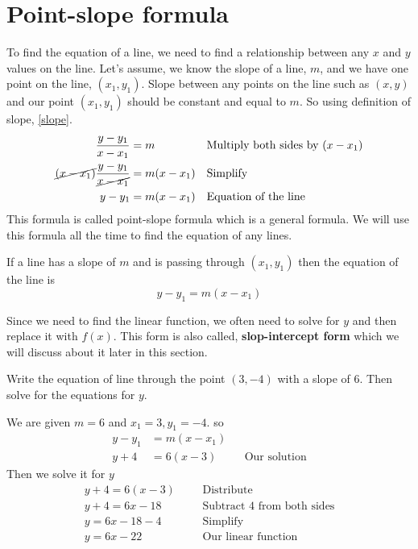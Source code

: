 \section{Point-slope formula}
To find the equation of a line, we need to find a relationship between any $x$ and $y$ values on the line. Let's assume, we know the slope of a line, $m$, and we have one point on the line, $(x_1,y_1)$. Slope between any points on the line such as $(x,y)$ and our point $(x_1,y_1)$ should be
constant and equal to $m$. So using definition of slope, \eqref{slope}.
\begin{align*}
		\frac{y-y_1}{x-x_1} &=m &&\text{Multiply both sides by $(x-x_1)$}
        \\
        \cancel{(x-x_1)}\frac{y-y_1}{ \cancel{x-x_1}} &=m(x-x_1) 
        								&&\text{Simplify} \\
         y-y_1 &= m (x-x_1)			&&\text{Equation of the line} 
\end{align*}
This formula is called point-slope formula which is a general formula. We
will use this formula all the time to find the equation of any lines.
\begin{tcolorbox}[
                    title=Point-Slope formula,
                    fonttitle=\bfseries,
                    colframe=blue!70!red,
                    colback=white
                    ]
    If a line has a slope of $m$ and is passing through $(x_1,y_1)$ then
    the equation of the line is 
    	\begin{equation}
    				y-y_1 = m(x-x_1) \label{point_slope}
    	\end{equation}
\end{tcolorbox}
\begin{nt}
Since we need to find the linear function, we often need to solve for $y$ and then replace it with $f(x)$. This form is also called, \textbf{slop-intercept form} which we will discuss about it later in this section.
\end{nt}
\begin{exa}
	Write the equation of line through the point $(3, -4)$ with a slope of $6$. Then solve for the equations for $y$.
\end{exa}

We are given $m=6$ and $x_1=3, y_1=-4$. so
\begin{align*}
		y-y_1  &=m(x-x_1) &&\\
        y+4 &=6(x-3) &&\text{Our solution}
\end{align*}
Then we solve it for $y$
\begin{align*}
        y+4 =6(x-3)& &&\text{Distribute}\\
        y+4 =6x-18&    &&\text{Subtract 4 from both sides}\\
        y =6x-18-4&    &&\text{Simplify}\\
        y =6x-22&    &&\text{Our linear function}
\end{align*}

